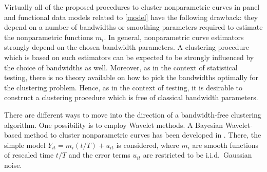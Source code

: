 \documentclass[a4paper,12pt]{article}
\begin{document}
Virtually all of the proposed procedures to cluster nonparametric curves in panel and functional data models related to \eqref{model} have the following drawback: they depend on a number of bandwidths or smoothing parameters required to estimate the nonparametric functions $m_i$. 
In general, nonparametric curve estimators strongly depend on the chosen bandwidth parameters. A clustering procedure which is based on such estimators can be expected to be strongly influenced by the choice of bandwidths as well. Moreover, as in the context of statistical testing, there is no theory available on how to pick the bandwidths optimally for the clustering problem. Hence, as in the context of testing, it is desirable to construct a clustering procedure which is free of classical bandwidth parameters. 


There are different ways to move into the direction of a bandwidth-free clustering algorithm. One possibility is to employ Wavelet methods. A Bayesian Wavelet-based method to cluster nonparametric curves has been developed in \cite{Ray2006}. There, the simple model $Y_{it} = m_i(t/T) + u_{it}$ is considered, where $m_i$ are smooth functions of rescaled time $t/T$ and the error terms $u_{it}$ are restricted to be i.i.d.\ Gaussian noise. 
\end{document}

